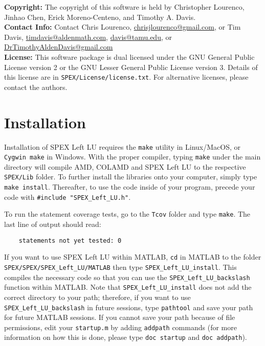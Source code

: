 \documentclass[12pt]{report}
\theoremstyle{definition}
\begin{document}
\textbf{Copyright:} The copyright of this software is held by  Christopher Lourenco, Jinhao Chen, Erick Moreno-Centeno, and Timothy A. Davis.\\

\noindent \textbf{Contact Info:} Contact Chris Lourenco,
\href{mailto:chrisjlourenco@gmail.com}{chrisjlourenco@gmail.com}, or Tim Davis,
\href{mailto:timdavis@aldenmath.com}{timdavis@aldenmath.com},
\href{mailto:davis@tamu.edu}{davis@tamu.edu}, or
\href{DrTimothyAldenDavis@gmail.com}{DrTimothyAldenDavis@gmail.com}\\

\noindent \textbf{License:} This software package is dual licensed under the GNU General Public License version 2 or the GNU Lesser General Public License version 3. Details of this license are in \verb|SPEX/License/license.txt|. For alternative licenses, please contact the authors.


\section{Installation} \label{s:install}

Installation of SPEX Left LU requires the \verb|make| utility in Linux/MacOS, or
\verb|Cygwin make| in Windows. With the proper compiler, typing \verb|make|
under the main directory will compile AMD, COLAMD and SPEX Left LU to the respective
\verb|SPEX/Lib| folder. To further install the libraries onto your computer,
simply type \verb|make install|.  Thereafter, to use the code inside of your
program, precede your code with \newline \verb|#include "SPEX_Left_LU.h"|.

To run the statement coverage tests, go to the \verb|Tcov| folder and
type \verb|make|.  The last line of output should read:

\begin{verbatim}
    statements not yet tested: 0
\end{verbatim}

If you want to use SPEX Left LU within MATLAB, 
\verb|cd| in MATLAB to the folder \verb|SPEX/SPEX/SPEX_Left_LU/MATLAB| then type
\newline \verb|SPEX_Left_LU_install|. This compiles the necessary code so that you can use
the \verb|SPEX_Left_LU_backslash| function within MATLAB. Note that
\newline \verb|SPEX_Left_LU_install| does not add the correct directory to your path; therefore,
if you want to use \verb|SPEX_Left_LU_backslash| in future sessions, type
\verb|pathtool| and save your path for future MATLAB sessions. If you cannot
save your path because of file permissions, edit your \verb|startup.m| by
adding \verb|addpath| commands (for more information on how this is done, please type \verb|doc startup| and \verb|doc addpath|).
\end{document}
